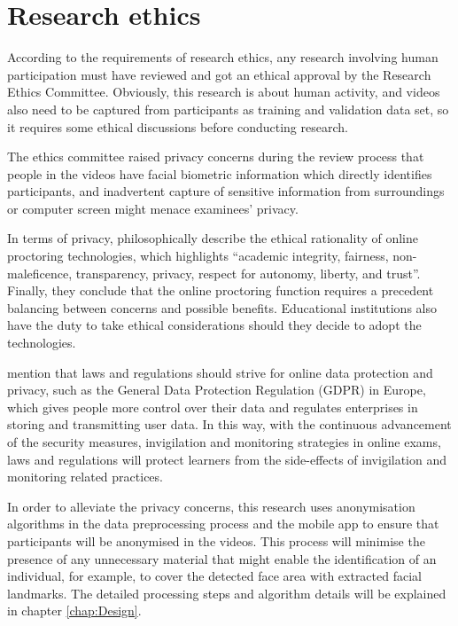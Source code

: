 \section{Research ethics}
\label{sec:Research ethics}
According to the requirements of research ethics, any research involving human participation must have reviewed and got an ethical approval by the Research Ethics Committee.
Obviously, this research is about human activity, and videos also need to be captured from participants as training and validation data set, so it requires some ethical discussions before conducting research.

The ethics committee raised privacy concerns during the review process that people in the videos have facial biometric information which directly identifies participants, and inadvertent capture of sensitive information from surroundings or computer screen might menace examinees' privacy.

In terms of privacy, \citet{coghlan2020good} philosophically describe the ethical rationality of online proctoring technologies, which highlights ``academic integrity, fairness, non-maleficence, transparency, privacy, respect for autonomy, liberty, and trust''.
Finally, they conclude that the online proctoring function requires a precedent balancing between concerns and possible benefits.
Educational institutions also have the duty to take ethical considerations should they decide to adopt the technologies.

\citet{bozkurt2020education} mention that laws and regulations should strive for online data protection and privacy, such as the General Data Protection Regulation (GDPR) in Europe, which gives people more control over their data and regulates enterprises in storing and transmitting user data.
In this way, with the continuous advancement of the security measures, invigilation and monitoring strategies in online exams, laws and regulations will protect learners from the side-effects of invigilation and monitoring related practices.

In order to alleviate the privacy concerns, this research uses anonymisation algorithms in the data preprocessing process and the mobile app to ensure that participants will be anonymised in the videos.
This process will minimise the presence of any unnecessary material that might enable the identification of an individual, for example, to cover the detected face area with extracted facial landmarks.
The detailed processing steps and algorithm details will be explained in chapter \ref{chap:Design}.